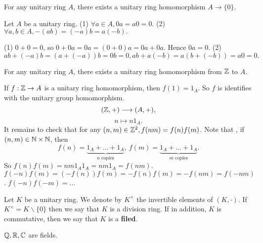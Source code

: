 \documentclass{book}
\numberwithin{equation}{section}
\begin{document}
\begin{propositionenv}
    For any unitary ring $A$, there exists a unitary ring homomorphism $A\rightarrow\{0\}$.
\end{propositionenv}
\begin{lemmaenv}
    Let $A$ be a unitary ring.
    \newline
    (1) $\forall a\in A, 0a=a0=0.$
    \newline
    (2) $\forall a,b\in A, -(ab)=(-a)b=a(-b).$
\end{lemmaenv}
\begin{proofenv}
    \quad\newline
    (1) $0+0=0$, so $0+0a=0a=(0+0)a=0a+0a$. Hence $0a=0$.
    \newline
    (2) $ab+(-a)b=(a+(-a))b=0b=0,ab+a(-b)=a(b+(-b))=a0=0.$
\end{proofenv}
\begin{propositionenv}
    For any unitary ring $A$, there exists a unitary ring homomorphism from $\mathbb{Z}$ to $A$.
\end{propositionenv}
\begin{proofenv}
    If $f:\mathbb{Z} \rightarrow A$ is a unitary ring homomorphism, then $f(1)=1_A$. So $f$ is identifies with the unitary group homomorphism.
    $$(\mathbb{Z},+)\longrightarrow(A,+),$$
    $$n\longmapsto n1_A.$$
    It remains to check that for any $(n,m)\in \mathbb{Z}^2,f(nm)=f(n)f(m)$. Note that , if $(n,m)\in \mathbb{N}\times\mathbb{N}$, then 
    $$f(n)=\underset{n \text{ copies}}{\underbrace{1_A+\dots+1_A}},\ f(m)=\underset{m \text{ copies}}{\underbrace{1_A+\dots+1_A}}.$$
    So $f(n)f(m)=nm1_A1_A=nm1_A=f(nm)$.
    $f(-n)f(m)=(-f(n))f(m)=-f(n)f(m)=-f(nm)=f(-nm)$.
    $f(-n)f(-m)=\dots$
\end{proofenv}
\begin{definitionenv}
    Let $K$ be a unitary ring. We denote by $K^\times$ the invertible elements of $(K,\cdot)$. If $K^\times=K\backslash\{0\}$ then we say that $K$ is a division ring. If in addition, $K$ is commutative, then we say that $K$ is a \textbf{filed}.
\end{definitionenv}
\begin{exampleenv}
    $\mathbb{Q},\mathbb{R},\mathbb{C}$ are fields.
\end{exampleenv}
\end{document}
